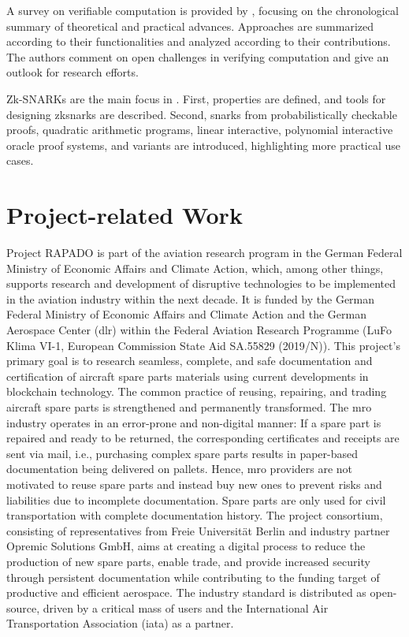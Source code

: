 A survey on verifiable computation is provided by \citet{Ahmad}, focusing on the chronological summary of theoretical and practical advances. Approaches are summarized according to their functionalities and analyzed according to their contributions. The authors comment on open challenges in verifying computation and give an outlook for research efforts. 

Zk-SNARKs are the main focus in \citet{NitulescuGentleIntroSNARKs}. First, properties are defined, and tools for designing \acrshort{zksnark}s are described. Second, \acrshort{snark}s from probabilistically checkable proofs, quadratic arithmetic programs, linear interactive, polynomial interactive oracle proof systems, and variants are introduced, highlighting more practical use cases. 

\section{Project-related Work}

Project RAPADO is part of the aviation research program in the German Federal Ministry of Economic Affairs and Climate Action, which, among other things, supports research and development of disruptive technologies to be implemented in the aviation industry within the next decade. It is funded by the German Federal Ministry of Economic Affairs and Climate Action and the German Aerospace Center (\acrshort{dlr}) within the Federal Aviation Research Programme (LuFo Klima VI-1, European Commission State Aid SA.55829 (2019/N)). This project's primary goal is to research seamless, complete, and safe documentation and certification of aircraft spare parts materials using current developments in blockchain technology. The common practice of reusing, repairing, and trading aircraft spare parts is strengthened and permanently transformed. The \acrshort{mro} industry operates in an error-prone and non-digital manner: If a spare part is repaired and ready to be returned, the corresponding certificates and receipts are sent via mail, i.e., purchasing complex spare parts results in paper-based documentation being delivered on pallets. Hence, \acrshort{mro} providers are not motivated to reuse spare parts and instead buy new ones to prevent risks and liabilities due to incomplete documentation. Spare parts are only used for civil transportation with complete documentation history. The project consortium, consisting of representatives from Freie Universit{\"a}t Berlin and industry partner Opremic Solutions GmbH, aims at creating a digital process to reduce the production of new spare parts, enable trade, and provide increased security through persistent documentation while contributing to the funding target of productive and efficient aerospace. The industry standard is distributed as open-source, driven by a critical mass of users and the International Air Transportation Association (\acrshort{iata}) as a partner.

